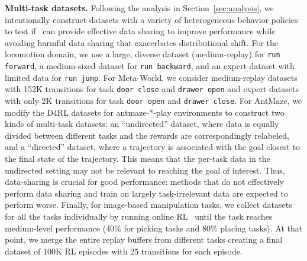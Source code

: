 \textbf{Multi-task datasets.}  Following the analysis in Section~\ref{sec:analysis}, we intentionally construct datasets with a variety of heterogeneous behavior policies to test if \cdsmethodname\ can provide effective data sharing to improve performance while avoiding harmful data sharing that exacerbates distributional shift. For the locomotion domain, we use a large, diverse dataset (medium-replay) for \texttt{run forward}, a medium-sized dataset for \texttt{run backward}, and an expert dataset with limited data for \texttt{run jump}. For Meta-World, we consider medium-replay datasets with 152K transitions for task \texttt{door close} and \texttt{drawer open} and expert datasets with only 2K transitions for task \texttt{door open} and \texttt{drawer close}. For AntMaze, we modify the D4RL datasets for antmaze-*-play environments to construct two kinds of multi-task datasets: an ``undirected'' dataset, where data is equally divided between different tasks and the rewards are correspondingly relabeled, and a ``directed'' dataset, where a trajectory is associated with the goal closest to the final state of the trajectory. This means that the per-task data in the undirected setting may not be relevant to reaching the goal of interest. Thus, data-sharing is crucial for good performance: methods that do not effectively perform data sharing and train on largely task-irrelevant data are expected to perform worse. Finally, for image-based manipulation tasks, we collect datasets for all the tasks individually by running online RL~\cite{kalashnikov2018scalable} until the task reaches medium-level performance (40\% for picking tasks and 80\% placing tasks). At that point, we merge the entire replay buffers from different tasks creating a final dataset of 100K RL episodes with 25 transitions for each episode.

